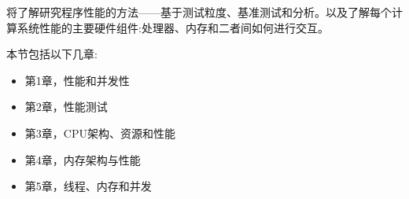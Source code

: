将了解研究程序性能的方法——基于测试粒度、基准测试和分析。以及了解每个计算系统性能的主要硬件组件:处理器、内存和二者间如何进行交互。

本节包括以下几章:

\begin{itemize}
\item 第1章，性能和并发性
\item 第2章，性能测试
\item 第3章，CPU架构、资源和性能
\item 第4章，内存架构与性能
\item 第5章，线程、内存和并发
\end{itemize}